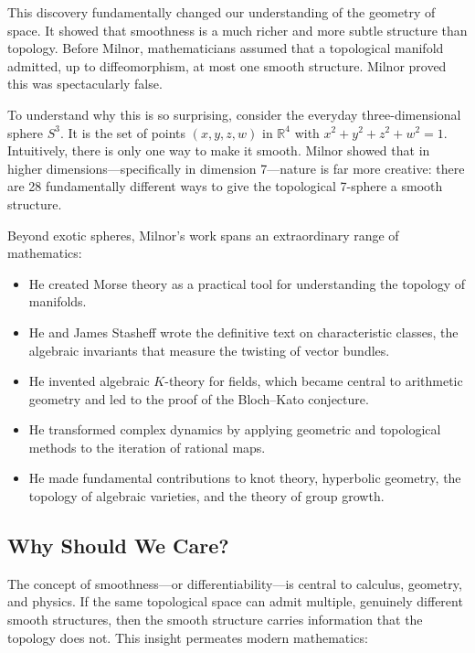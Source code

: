 This discovery fundamentally changed our understanding of the geometry of space. It showed that smoothness is a much richer and more subtle structure than topology. Before Milnor, mathematicians assumed that a topological manifold admitted, up to diffeomorphism, at most one smooth structure. Milnor proved this was spectacularly false.

To understand why this is so surprising, consider the everyday three-dimensional sphere $S^3$. It is the set of points $(x,y,z,w)$ in $\mathbb{R}^4$ with $x^2 + y^2 + z^2 + w^2 = 1$. Intuitively, there is only one way to make it smooth. Milnor showed that in higher dimensions---specifically in dimension 7---nature is far more creative: there are 28 fundamentally different ways to give the topological 7-sphere a smooth structure.

Beyond exotic spheres, Milnor's work spans an extraordinary range of mathematics:
\begin{itemize}
\item He created Morse theory as a practical tool for understanding the topology of manifolds.
\item He and James Stasheff wrote the definitive text on characteristic classes, the algebraic invariants that measure the twisting of vector bundles.
\item He invented algebraic $K$-theory for fields, which became central to arithmetic geometry and led to the proof of the Bloch--Kato conjecture.
\item He transformed complex dynamics by applying geometric and topological methods to the iteration of rational maps.
\item He made fundamental contributions to knot theory, hyperbolic geometry, the topology of algebraic varieties, and the theory of group growth.
\end{itemize}

\subsection{Why Should We Care?}

The concept of smoothness---or differentiability---is central to calculus, geometry, and physics. If the same topological space can admit multiple, genuinely different smooth structures, then the smooth structure carries information that the topology does not. This insight permeates modern mathematics:

